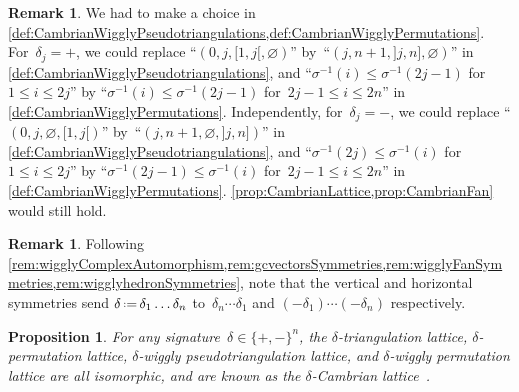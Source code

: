 \documentclass{amsart}
\newtheorem{proposition}[theorem]{Proposition}
\theoremstyle{definition}
\newtheorem{remark}[theorem]{Remark}
\newcommand{\eqdef}{\mbox{\,\raisebox{0.2ex}{\scriptsize\ensuremath{\mathrm:}}\ensuremath{=}\,}} %
\newcommand{\darkblue}{\color{darkblue}} %
\newcommand{\defn}[1]{\textsl{\darkblue #1}} %
\begin{document}
\begin{remark}
We had to make a choice in \cref{def:CambrianWigglyPseudotriangulations,def:CambrianWigglyPermutations}.
For~$\delta_j = {+}$, we could replace ``$(0, j, {[1,j[}, \varnothing)$'' by~``$(j, n+1, {]j,n]}, \varnothing)$'' in \cref{def:CambrianWigglyPseudotriangulations}, and ``$\sigma^{-1}(i) \le \sigma^{-1}(2j-1)$ for~$1 \le i \le 2j$'' by ``$\sigma^{-1}(i) \le \sigma^{-1}(2j-1)$ for~$2j-1 \le i \le 2n$'' in \cref{def:CambrianWigglyPermutations}.
Independently, for~$\delta_j = {-}$, we could replace ``$(0, j, \varnothing, {[1,j[})$'' by~``$(j, n+1, \varnothing, {]j,n]})$'' in \cref{def:CambrianWigglyPseudotriangulations}, and ``$\sigma^{-1}(2j) \le \sigma^{-1}(i)$ for~$1 \le i \le 2j$'' by ``$\sigma^{-1}(2j-1) \le \sigma^{-1}(i)$ for~$2j-1 \le i \le 2n$'' in \cref{def:CambrianWigglyPermutations}.
\cref{prop:CambrianLattice,prop:CambrianFan} would still hold.
\end{remark}

\begin{remark}
\label{rem:CambrianSymmetries}
Following \cref{rem:wigglyComplexAutomorphism,rem:gcvectorsSymmetries,rem:wigglyFanSymmetries,rem:wigglyhedronSymmetries}, note that the vertical and horizontal symmetries send $\delta \eqdef \delta_1 \dots \delta_n$ to~$\delta_n \cdots \delta_1$ and $(-\delta_1) \cdots (-\delta_n)$ respectively.
\end{remark}

\begin{proposition}
\label{prop:CambrianLattice}
For any signature~$\delta \in \{+,-\}^n$, the $\delta$-triangulation lattice, $\delta$-permutation lattice, \mbox{$\delta$-wiggly} pseudotriangulation lattice, and $\delta$-wiggly permutation lattice are all isomorphic, and are known as the \defn{$\delta$-Cambrian lattice}~\cite{Reading-CambrianLattices}.
\end{proposition}
\end{document}
